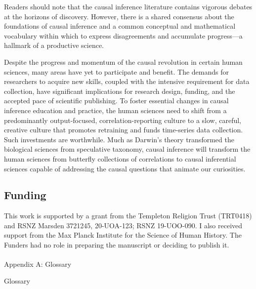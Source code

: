 \documentclass[
  single column]{article}
\makeatletter
\let\oldparagraph\paragraph
\renewcommand{\paragraph}{
    \@ifstar
      \xxxParagraphStar
      \xxxParagraphNoStar
  }
\newcommand{\xxxParagraphStar}[1]{\oldparagraph*{#1}\mbox{}}
\newcommand{\xxxParagraphNoStar}[1]{\oldparagraph{#1}\mbox{}}
\makeatother
\begin{document}
Readers should note that the causal inference literature contains
vigorous debates at the horizons of discovery. However, there is a
shared consensus about the foundations of causal inference and a common
conceptual and mathematical vocabulary within which to express
disagreements and accumulate progress---a hallmark of a productive
science.

Despite the progress and momentum of the causal revolution in certain
human sciences, many areas have yet to participate and benefit. The
demands for researchers to acquire new skills, coupled with the
intensive requirement for data collection, have significant implications
for research design, funding, and the accepted pace of scientific
publishing. To foster essential changes in causal inference education
and practice, the human sciences need to shift from a predominantly
output-focused, correlation-reporting culture to a slow, careful,
creative culture that promotes retraining and funds time-series data
collection. Such investments are worthwhile. Much as Darwin's theory
transformed the biological sciences from speculative taxonomy, causal
inference will transform the human sciences from butterfly collections
of correlations to causal inferential sciences capable of addressing the
causal questions that animate our curiosities.

\newpage{}

\subsection{Funding}\label{funding}

This work is supported by a grant from the Templeton Religion Trust
(TRT0418) and RSNZ Marsden 3721245, 20-UOA-123; RSNZ 19-UOO-090. I also
received support from the Max Planck Institute for the Science of Human
History. The Funders had no role in preparing the manuscript or deciding
to publish it.

\newpage{}

\paragraph{Appendix A: Glossary}\label{id-app-a}

\begin{table}

\caption{\label{tbl-gloassary}Glossary}

\centering{

\glossaryTerms

}

\end{table}%
\end{document}
